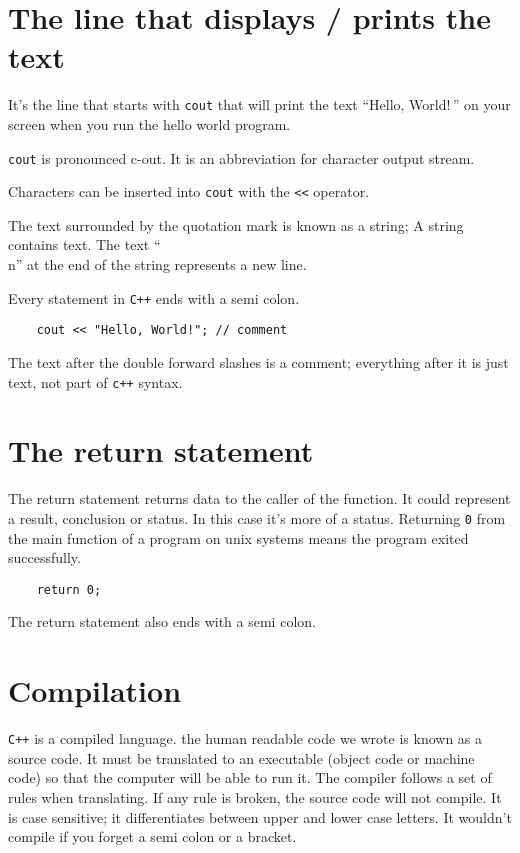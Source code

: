 \documentclass{book}
\begin{document}
\section{The line that displays / prints the text}
It's the line that starts with \verb|cout| that will print the text ``Hello, World!\,'' on your screen when you run the hello world program.

\verb|cout| is pronounced c-out. It is an abbreviation for character output stream.

Characters can be inserted into \verb|cout| with the \verb|<<| operator.

The text surrounded by the quotation mark is known as a string; A string contains text. The text ``\\n'' at the end of the string represents a new line.

Every statement in \verb|C++| ends with a semi colon.

\begin{verbatim}
	cout << "Hello, World!"; // comment
\end{verbatim}

\begin{itshape}
	The text after the double forward slashes is a comment; everything after it is just text, not part of \verb|c++| syntax.
\end{itshape}

\section{The return statement}
The return statement returns data to the caller of the function. It could represent a result, conclusion or status. In this case it's more of a status. Returning \verb|0| from the main function of a program on unix systems means the program exited successfully.

\begin{verbatim}
	return 0;
\end{verbatim}

The return statement also ends with a semi colon.

\section{Compilation}
\verb|C++| is a compiled language. the human readable code we wrote is known as a source code. It must be translated to an executable (object code or machine code) so that the computer will be able to run it.
The compiler follows a set of rules when translating. If any rule is broken, the source code will not compile. It is case sensitive; it differentiates between upper and lower case letters. It wouldn't compile if you forget a semi colon or a bracket.
\end{document}
